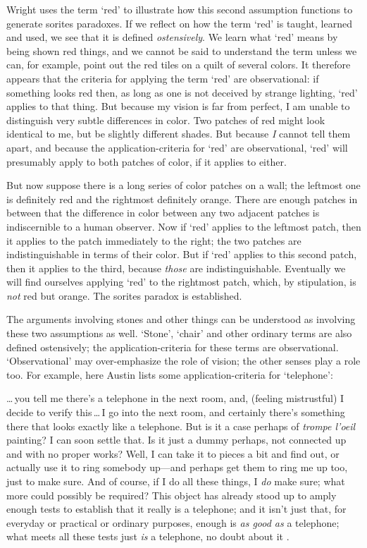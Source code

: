 \documentclass[11pt]{standalone}
\newenvironment{squote}{%
\begin{spacing}{1}
       	\begin{list}{}{%
\setlength{\labelwidth}{0pt}%
\rightmargin\leftmargin%
}
\item\relax
}{%
\end{list}%
\end{spacing}
}
\begin{document}
\begin{spacing}{1.5}
Wright uses the term `red' to illustrate how this second assumption
functions to generate sorites paradoxes.  If we reflect on how the
term `red' is taught, learned and used, we see that it is defined
\emph{ostensively}.  We learn what `red' means by being shown red
things, and we cannot be said to understand the term unless we can,
for example, point out the red tiles on a quilt of several colors.  It
therefore appears that the criteria for applying the term `red' are
observational: if something looks red then, as long as one is not
deceived by strange lighting, `red' applies to that thing.  But
because my vision is far from perfect, I am unable to distinguish very
subtle differences in color.  Two patches of red might look identical
to me, but be slightly different shades.  But because \emph{I} cannot
tell them apart, and because the application-criteria for `red' are
observational, `red' will presumably apply to both patches of color,
if it applies to either.

But now suppose there is a long series of color patches on a wall; the
leftmost one is definitely red and the rightmost definitely orange.
There are enough patches in between that the difference in color
between any two adjacent patches is indiscernible to a human observer.
Now if `red' applies to the leftmost patch, then it applies to the
patch immediately to the right; the two patches are indistinguishable
in terms of their color.  But if `red' applies to this second patch,
then it applies to the third, because \emph{those} are
indistinguishable.  Eventually we will find ourselves applying `red'
to the rightmost patch, which, by stipulation, is \emph{not} red but
orange.  The sorites paradox is established.

The arguments involving stones and other things can be understood as
involving these two assumptions as well.  `Stone', `chair' and other
ordinary terms are also defined ostensively; the application-criteria
for these terms are observational.  `Observational' may over-emphasize
the role of vision; the other senses play a role too.  For example,
here Austin lists some application-criteria for `telephone':

\begin{squote}
\ldots\,you tell me there's a telephone in the next room, and,
(feeling mistrustful) I decide to verify this\,\ldots\,I go into the
next room, and certainly there's something there that looks exactly
like a telephone.  But is it a case perhaps of \emph{trompe l'oeil}
painting?  I can soon settle that.  Is it just a dummy perhaps, not
connected up and with no proper works?  Well, I can take it to pieces
a bit and find out, or actually use it to ring somebody up---and
perhaps get them to ring me up too, just to make sure.  And of course,
if I do all these things, I \emph{do} make sure; what more could
possibly be required?  This object has already stood up to amply
enough tests to establish that it really is a telephone; and it isn't
just that, for everyday or practical or ordinary purposes, enough is
\emph{as good as} a telephone; what meets all these tests just
\emph{is} a telephone, no doubt about it \citep[118--119]{austin1964}.
\end{squote}


\end{spacing}
\end{document}
